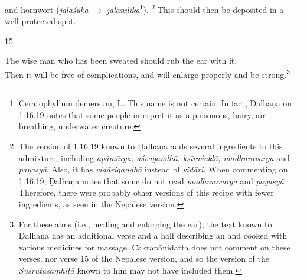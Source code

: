 \begin{translation}
         and hornwort (\emph{jalaśūka} $\rightarrow$
        \emph{jalanīlikā}\footnote{Ceratophyllum demersum, L. %
            This name is not certain. In fact, Ḍalhaṇa on 1.16.19
            \citep[79]{vulgate} notes that some people interpret it as a
            poisonous, hairy, air-breathing, underwater creature.}).%
            \footnote{The version of 1.16.19 known to Ḍalhaṇa \citep[79]{vulgate}
                adds several ingredients to this admixture, including \emph{apāmārga,
                aśvagandhā, kṣīraśuklā, madhuravarga} and \emph{payasyā}. Also, it has
                \emph{vidārigandhā} instead of \emph{vidāri}. When commenting on
                1.16.19, Ḍalhaṇa \citep[79]{vulgate} notes that some do not read
                \emph{madhuravarga} and \emph{payasyā}. Therefore, there were probably
                other versions of this recipe with fewer ingredients, as seen in the
                Nepalese version.} %
                This should then be deposited in a well-protected spot.
    
\item[15]%
    \begin{sloka}
The wise man who has been sweated should rub the  ear with
it.\\ Then it will be free of complications, and will enlarge properly and be
strong.\footnote{For these aims (i.e., healing and enlarging the ear), the text
    known to Ḍalhaṇa \citep[79]{vulgate} has an additional verse and a half describing
    an  and  cooked
    with various medicines for massage. Cakrapāṇidatta \citep[131]{acar-1939} does not
    comment on these verses, nor verse 15 of the Nepalese version, and so the version
    of the \emph{Suśrutasaṃhitā} known to him may not have included them.}
    \end{sloka}
    

\end{translation}
